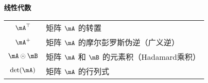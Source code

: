 \vspace{\notationgap}
\begin{minipage}{\textwidth}
\centerline{\bf 线性代数}
\bgroup
\def\arraystretch{1.5}
\begin{tabular}{cp{3.25in}}
$\displaystyle \mA^\top$ & 矩阵 $\mA$ 的转置 \\
$\displaystyle \mA^+$ & 矩阵 $\mA$ 的摩尔彭罗斯伪逆（广义逆）\\
$\displaystyle \mA \odot \mB $ & 矩阵 $\mA$ 和 $\mB$ 的元素积（Hadamard乘积）\\
$\displaystyle \mathrm{det}(\mA)$ & 矩阵 $\mA$ 的行列式\\
\end{tabular}
\egroup
{}
\end{minipage}

